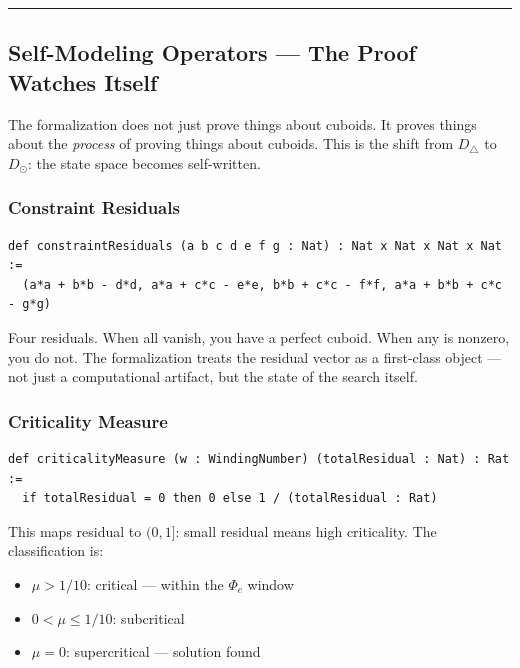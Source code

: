 \documentclass[12pt,a4paper]{article}
\begin{document}
\begin{center}
\rule{0.5\textwidth}{0.4pt}
\end{center}

\subsection{Self-Modeling Operators --- The Proof Watches Itself}

The formalization does not just prove things about cuboids. It proves things about the \emph{process} of proving things about cuboids. This is the shift from $D_{\triangle}$ to $D_{\odot}$: the state space becomes self-written.

\subsubsection{Constraint Residuals}

\begin{lstlisting}[language=lean]
def constraintResiduals (a b c d e f g : Nat) : Nat x Nat x Nat x Nat :=
  (a*a + b*b - d*d, a*a + c*c - e*e, b*b + c*c - f*f, a*a + b*b + c*c - g*g)
\end{lstlisting}

Four residuals. When all vanish, you have a perfect cuboid. When any is nonzero, you do not. The formalization treats the residual vector as a first-class object --- not just a computational artifact, but the state of the search itself.

\subsubsection{Criticality Measure}

\begin{lstlisting}[language=lean]
def criticalityMeasure (w : WindingNumber) (totalResidual : Nat) : Rat :=
  if totalResidual = 0 then 0 else 1 / (totalResidual : Rat)
\end{lstlisting}

This maps residual to $(0, 1]$: small residual means high criticality. The classification is:

\begin{itemize}
    \item $\mu > 1/10$: critical --- within the $\Phi_c$ window
    \item $0 < \mu \leq 1/10$: subcritical
    \item $\mu = 0$: supercritical --- solution found
\end{itemize}
\end{document}
